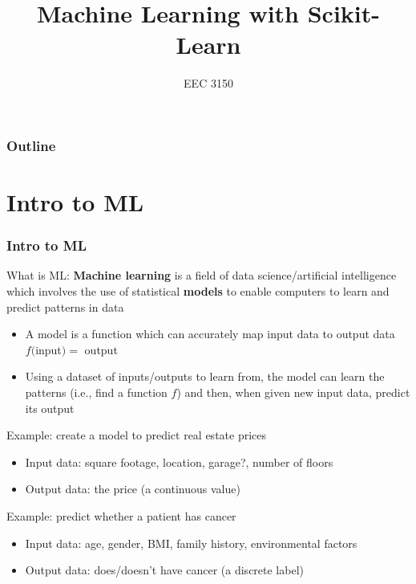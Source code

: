 \documentclass{beamer}
\title{Machine Learning with Scikit-Learn}
\author{EEC 3150}
\date{}
\institute{Trevecca Nazarene University}
\begin{document}
\frame{\titlepage}
 
\begin{frame}	
	\frametitle{Outline}
	\tableofcontents	
\end{frame}


\section{Intro to ML}

\begin{frame}	
\end{frame}

\begin{frame}	
	\frametitle{Intro to ML}
	
	\begin{alertblock}{What is ML:}
		\footnotesize
		\textbf{Machine learning} is a field of data science/artificial intelligence which involves the use of statistical \textbf{models} to enable computers to learn and predict patterns in data
		\begin{itemize}
			\item A model is a function which can accurately map input data to output data \\
			$f($input$) = $ output
			\item Using a dataset of inputs/outputs to learn from, the model can learn the patterns (i.e., find a function $f$) and then, when given new input data, predict its output
		\end{itemize}
		
		\vspace{10pt}
		Example: create a model to predict real estate prices
		\begin{itemize}
			\item Input data: square footage, location, garage?, number of floors
			\item Output data: the price (a continuous value)
		\end{itemize}
		
		\vspace{10pt}
		Example: predict whether a patient has cancer
		\begin{itemize}
			\item Input data: age, gender, BMI, family history, environmental factors
			\item Output data: does/doesn't have cancer (a discrete label)
		\end{itemize}
	\end{alertblock}
\end{frame}
\end{document}
